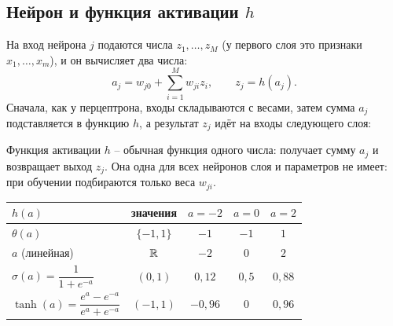 \documentclass[12pt,a4paper]{article}
\begin{document}
\subsection{Нейрон и функция активации \texorpdfstring{$h$}{h}}

На вход нейрона $j$ подаются числа $z_1, \dots, z_M$ (у первого слоя это
признаки $x_1, \dots, x_m$), и он вычисляет два числа:
\begin{equation}\label{eq:neuron}
  a_j = w_{j0} + \sum_{i=1}^{M} w_{ji}z_i,
  \qquad
  z_j = h(a_j) .
\end{equation}
Сначала, как у перцептрона, входы складываются с весами, затем сумма $a_j$
подставляется в функцию $h$, а результат $z_j$ идёт на входы следующего слоя:
\begin{center}
\end{center}
Функция активации $h$ -- обычная функция одного числа: получает сумму $a_j$ и
возвращает выход $z_j$. Она одна для всех нейронов слоя и параметров не имеет:
при обучении подбираются только веса $w_{ji}$.
\begin{center}
\begin{tabular}{lcccc}
\toprule
$h(a)$ & значения & $a = -2$ & $a = 0$ & $a = 2$ \\
\midrule
$\theta(a)$ & $\{-1, 1\}$ & $-1$ & $-1$ & $1$ \\
$a$ (линейная) & $\mathbb{R}$ & $-2$ & $0$ & $2$ \\
$\sigma(a) = \dfrac{1}{1 + e^{-a}}$ & $(0, 1)$ & $0{,}12$ & $0{,}5$ & $0{,}88$ \\[3mm]
$\tanh(a) = \dfrac{e^a - e^{-a}}{e^a + e^{-a}}$ & $(-1, 1)$ & $-0{,}96$ & $0$
  & $0{,}96$ \\[2mm]
\bottomrule
\end{tabular}
\end{center}
\end{document}
